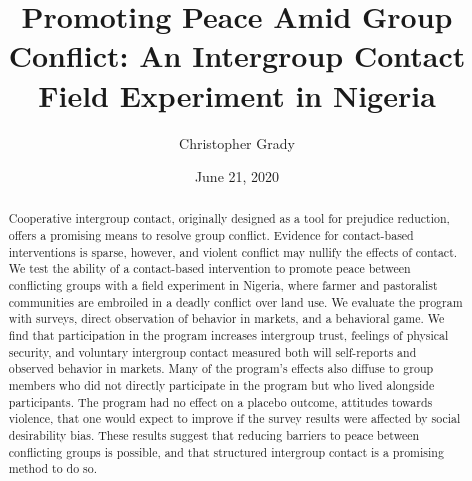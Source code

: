 \documentclass[11pt]{article}
\title{Promoting Peace Amid Group Conflict: An Intergroup Contact Field
Experiment in Nigeria}
\author{
Christopher Grady
}
\date{June 21, 2020}
\begin{document}
\VerbatimFootnotes

%
%
%
%
%
%
%
%
%
%

\maketitle

\begin{abstract}

Cooperative intergroup contact, originally designed as a tool for prejudice reduction, offers a promising means to resolve group conflict.  Evidence for contact-based interventions is sparse, however, and violent conflict may nullify the effects of contact.  We test the ability of a contact-based intervention to promote peace between conflicting groups with a field experiment in Nigeria, where farmer and pastoralist communities are embroiled in a deadly conflict over land use.  We evaluate the program with surveys, direct observation of behavior in markets, and a behavioral game.  We find that participation in the program increases intergroup trust, feelings of physical security, and voluntary intergroup contact measured both will self-reports and observed behavior in markets.  Many of the program's effects also diffuse to group members who did not directly participate in the program but who lived alongside participants. The program had no effect on a placebo outcome, attitudes towards violence, that one would expect to improve if the survey results were affected by social desirability bias.  These results suggest that reducing barriers to peace between conflicting groups is possible, and that structured intergroup contact is a promising method to do so.

\end{abstract}
\end{document}
